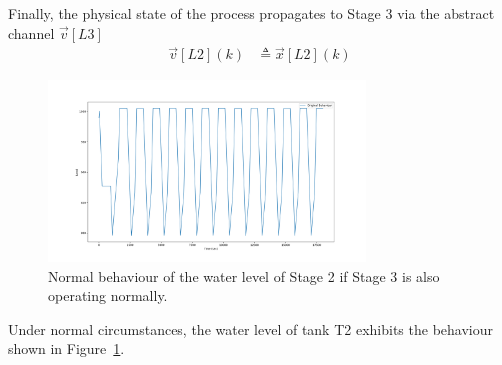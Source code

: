 {Finally, the physical state of the process propagates to Stage 3 via the abstract channel $\vec{v}[L3]$
\begin{align}
  \vec{v}[L2](k)&\triangleq \vec{x}[L2](k)
\end{align}


\begin{figure}[t]
  \includegraphics[width=0.75\textwidth]{Figures/Stage2Normal.png}
  \caption{Normal behaviour of the water level of Stage 2 if Stage 3 is also operating normally.}
  \label{fig:Stage2Normal}
\end{figure}
Under normal circumstances, the water level of tank T2 exhibits the behaviour shown in Figure~\ref{fig:Stage2Normal}.


}
